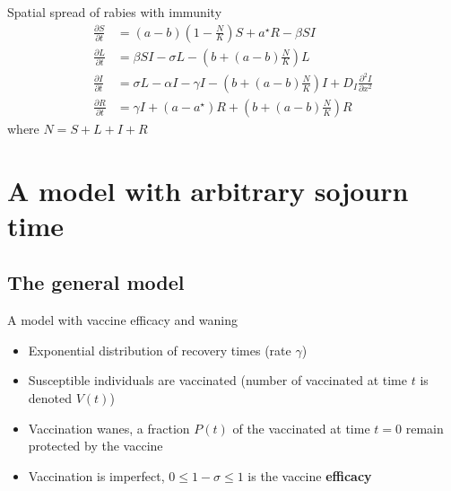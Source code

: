 \documentclass[aspectratio=169]{beamer}\usepackage[]{graphicx}\usepackage[]{xcolor}
\begin{document}

\begin{frame}{Spatial spread of rabies with immunity}
\begin{subequations}
\label{sys:rabies}
\begin{align}
\frac{\partial S}{\partial t} &= 
(a-b)\left(1-\frac NK\right)S+a^\star R-\beta SI \label{sys:rabies_S} \\
\frac{\partial L}{\partial t} &= 
\beta SI-\sigma L-\left(b+(a-b)\frac NK\right)L \label{sys:rabies_L} \\
\frac{\partial I}{\partial t} &= 
\sigma L-\alpha I-\gamma I-\left(b+(a-b)\frac NK\right)I 
+ D_I\frac{\partial^2 I}{\partial x^2} \label{sys:rabies_I} \\
\frac{\partial R}{\partial t} &= 
\gamma I+(a-a^\star)R+\left(b+(a-b)\frac NK\right)R \label{sys:rabies_R}
\end{align}
\end{subequations}
where $N=S+L+I+R$
\end{frame}

\section{A model with arbitrary sojourn time}


\subsection{The general model}

\begin{frame}{A model with vaccine efficacy and waning}
\begin{itemize}
\item Exponential distribution of recovery times (rate $\gamma$)
\vfill
\item Susceptible individuals are vaccinated (number of vaccinated at time $t$ is denoted $V(t)$)
\vfill
\item Vaccination wanes, a fraction $P(t)$ of the vaccinated at time $t=0$ remain protected by the vaccine
\vfill
\item Vaccination is imperfect, $0\leq 1-\sigma\leq 1$ is the vaccine \textbf{efficacy}
\end{itemize}
\end{frame}
\end{document}
